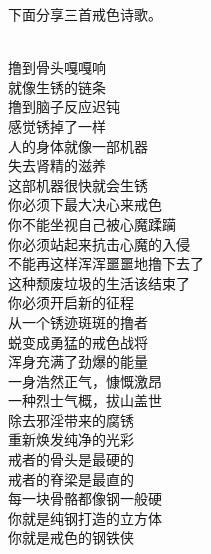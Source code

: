 下面分享三首戒色诗歌。

\begin{poem}[戒色除锈行动]
    \begin{multicols}{3}
        \centering~\\
        撸到骨头嘎嘎响 \\ 就像生锈的链条 \\ 撸到脑子反应迟钝 \\ 感觉锈掉了一样 \\ 人的身体就像一部机器 \\ 失去肾精的滋养 \\ 这部机器很快就会生锈 \\ 你必须下最大决心来戒色 \\ 你不能坐视自己被心魔蹂躏 \\ 你必须站起来抗击心魔的入侵 \\ 不能再这样浑浑噩噩地撸下去了 \\ 这种颓废垃圾的生活该结束了 \\ 你必须开启新的征程 \\ 从一个锈迹斑斑的撸者 \\ 蜕变成勇猛的戒色战将 \\ 浑身充满了劲爆的能量 \\ 一身浩然正气，慷慨激昂 \\ 一种烈士气概，拔山盖世 \\ 除去邪淫带来的腐锈 \\ 重新焕发纯净的光彩 \\ 戒者的骨头是最硬的 \\ 戒者的脊梁是最直的 \\ 每一块骨骼都像钢一般硬 \\ 你就是纯钢打造的立方体 \\ 你就是戒色的钢铁侠
    \end{multicols}
\end{poem}

